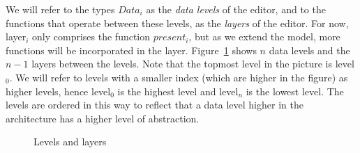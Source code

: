 We will refer to the types $Data_i$ as the {\em data levels} of the editor, and to the functions that operate between these levels, as the {\em layers} of the editor. For now, layer$_i$ only comprises the function $present_i$, but as we extend the model, more functions will be incorporated in the layer. Figure~\ref{levelsandlayers} shows $n$ data levels and the $n-1$ layers between the levels. Note that the topmost level in the picture is level$_0$. We will refer to levels with a smaller index (which are higher in the figure) as higher levels, hence level$_0$ is the highest level and level$_n$ is the lowest level. The levels are ordered in this way to reflect that a data level higher in the architecture has a higher level of abstraction. 
\begin{figure}
\begin{small}
\begin{center}
\begin{center}
\begin{small}
\bigskip \noindent
{}
\end{small}
\end{center}\caption{Levels and layers}\label{levelsandlayers} 
\end{center}
\end{small}
\end{figure}


